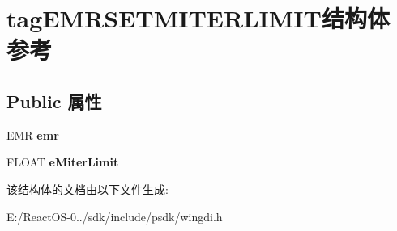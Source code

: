 \hypertarget{structtag_e_m_r_s_e_t_m_i_t_e_r_l_i_m_i_t}{}\section{tag\+E\+M\+R\+S\+E\+T\+M\+I\+T\+E\+R\+L\+I\+M\+I\+T结构体 参考}
\label{structtag_e_m_r_s_e_t_m_i_t_e_r_l_i_m_i_t}
\subsection*{Public 属性}
\begin{DoxyCompactItemize}
\item 
\mbox{\label{structtag_e_m_r_s_e_t_m_i_t_e_r_l_i_m_i_t_a19984a586f054858d64daec4193f3628}} 
\hyperlink{structtag_e_m_r}{E\+MR} {\bfseries emr}
\item 
\mbox{\label{structtag_e_m_r_s_e_t_m_i_t_e_r_l_i_m_i_t_aac8efd894a2d5b7af843f2aa8900cca7}} 
F\+L\+O\+AT {\bfseries e\+Miter\+Limit}
\end{DoxyCompactItemize}


该结构体的文档由以下文件生成\+:\begin{DoxyCompactItemize}
\item 
E\+:/\+React\+O\+S-\/0../sdk/include/psdk/wingdi.\+h\end{DoxyCompactItemize}
